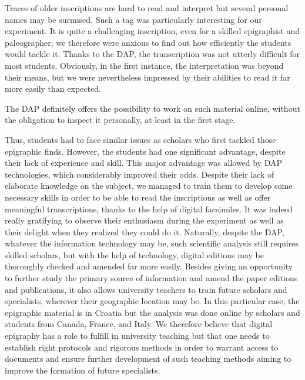 \documentclass[amsthm,ebook]{saparticle}
\begin{document}
Traces of older inscriptions are hard to read and interpret but several personal names may be surmised. Such a tag was
particularly interesting for our experiment. It is quite a challenging inscription, even for a skilled epigraphist and
paleographer; we therefore were anxious to find out how efficiently the students would tackle it. Thanks to the DAP,
the transcription was not utterly difficult for most students. Obviously, in the first instance, the interpretation was
beyond their means, but we were nevertheless impressed by their abilities to read it far more easily than expected. 

\newpage
The DAP definitely offers the possibility to work on such material online, without the obligation to inspect it personally,
at least in the first stage.

Thus, students had to face similar issues as scholars who first tackled those epigraphic finds. However, the students
had one significant advantage, despite their lack of experience and skill. This major advantage was allowed by DAP
technologies, which considerably improved their odds. Despite their lack of elaborate knowledge on the subject, we
managed to train them to develop some necessary skills in order to be able to read the inscriptions as well as offer
meaningful transcriptions, thanks to the help of digital facsimiles. It was indeed really gratifying to observe their
enthusiasm during the experiment as well as their delight when they realized they could do it. Naturally, despite the
DAP, whatever the information technology may be, such scientific analysis still requires skilled scholars, but with the
help of technology, digital editions may be thoroughly checked and amended far more easily. Besides giving an
opportunity to further study the primary source of information and amend the paper editions and publications, it also allows university teachers to train future scholars and specialists, wherever their geographic location may be. In this
particular case, the epigraphic material is in Croatia but the analysis was done online by scholars and students from
Canada, France, and Italy. We therefore believe that digital epigraphy has a role to fulfill in university teaching but
that one needs to establish right protocols and rigorous methods in order to warrant access to documents and ensure
further development of such teaching methods aiming to improve the formation of future specialists.
\end{document}
